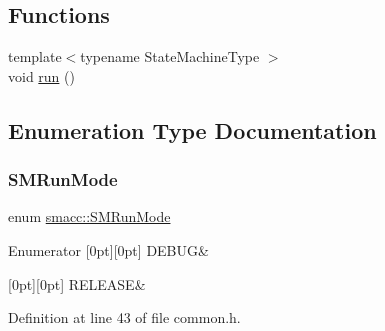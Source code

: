 \subsection*{Functions}
\begin{DoxyCompactItemize}
\item 
{\footnotesize template$<$typename State\+Machine\+Type $>$ }\\void \hyperlink{namespacesmacc_a47ac3b8d2968b1ba4152afd64ab66bd0}{run} ()
\end{DoxyCompactItemize}


\subsection{Enumeration Type Documentation}
\mbox{\label{namespacesmacc_a3e4f79486ea6ea6342dd3c712d16a4f6}} 
\subsubsection{\texorpdfstring{S\+M\+Run\+Mode}{SMRunMode}}
{\footnotesize\ttfamily enum \hyperlink{namespacesmacc_a3e4f79486ea6ea6342dd3c712d16a4f6}{smacc\+::\+S\+M\+Run\+Mode}\hspace{0.3cm}{\ttfamily [strong]}}

\begin{DoxyEnumFields}{Enumerator}
[0pt][0pt]{}\mbox{\label{namespacesmacc_a3e4f79486ea6ea6342dd3c712d16a4f6adc30ec20708ef7b0f641ef78b7880a15}} 
D\+E\+B\+UG&\\
\hline

[0pt][0pt]{}\mbox{\label{namespacesmacc_a3e4f79486ea6ea6342dd3c712d16a4f6a7d649ef069df9885e382417c79f3d5cd}} 
R\+E\+L\+E\+A\+SE&\\
\hline

\end{DoxyEnumFields}


Definition at line 43 of file common.\+h.


